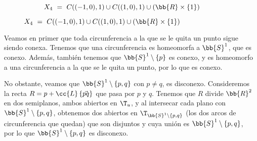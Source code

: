 \begin{ejercicio}
\begin{figure}[H]
\begin{subfigure}[c]{0.5\linewidth}
            \caption{\centering $X_4~=~C((-1, 0), 1) \cup C((1, 0), 1) \cup (\bb{R} \times \{1\}) $}
        \end{subfigure}
    \end{figure}

    Veamos en primer que toda circunferencia a la que se le quita un punto sigue siendo conexa. Tenemos que una circunferencia es homeomorfa a $\bb{S}^1$,
    que es conexo. Además, también tenemos que $\bb{S}^1\setminus \{p\}$ es conexo, y es homeomorfo a una circunferencia a la que se le quita un punto, 
    por lo que es conexo.

    No obstante, veamos que $\bb{S}^1\setminus \{p,q\}$ con $p\neq q$, es disconexo. Consideremos la recta $R=p+\cc{L}\left\{\vec{pq}\right\}$ que
    pasa por $p$ y $q$. Tenemos que $R$ divide $\bb{R}^2$ en dos semiplanos, ambos abiertos en $\T_u$, y al intersecar cada plano con $\bb{S}^1\setminus \{p,q\}$,
    obtenemos dos abiertos en $\T_{\bb{S}^1\setminus \{p,q\}}$ (los dos arcos de circunferencia que quedan) que son disjuntos y cuya unión es $\bb{S}^1\setminus \{p,q\}$,
    por lo que $\bb{S}^1\setminus \{p,q\}$ es disconexo.


\end{ejercicio}
